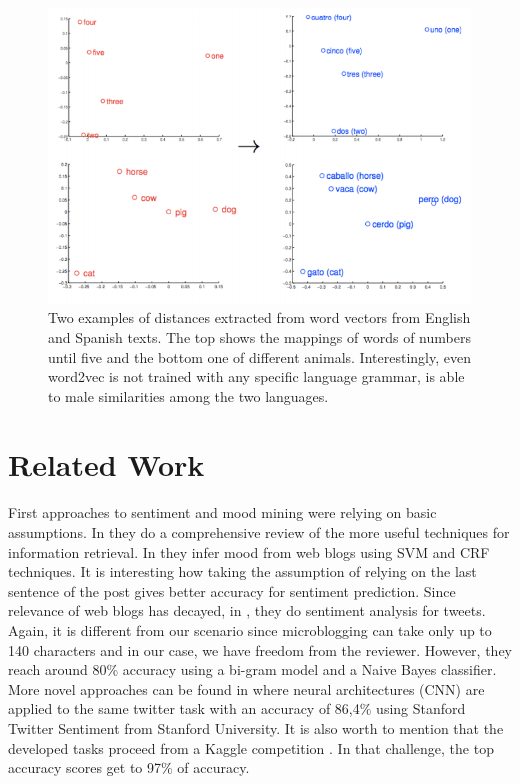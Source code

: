\documentclass[conference]{IEEEtran}
\theoremstyle{plain}
\theoremstyle{definition}
\theoremstyle{remark}
\begin{document}
\begin{figure}[htb]
	\centering
	\includegraphics[width=.75\linewidth]{word2vec_translation.png}
	\caption[bla.]{Two examples of distances extracted from word vectors from English and Spanish texts. The top shows the mappings of words of numbers until five and the bottom one of different animals. Interestingly, even word2vec is not trained with any specific language grammar, is able to male similarities among the two languages.}
	\label{fig:lap}
\end{figure}



\section{Related Work}
\label{sec:basics}
First approaches to sentiment and mood mining were relying on basic assumptions. In \cite{Pang} they do a comprehensive review of the more useful techniques for information retrieval.  In \cite{Yang} they infer mood from web blogs using SVM and CRF techniques. It is interesting how taking the assumption of relying on the last sentence of the post gives better accuracy for sentiment prediction. Since relevance of web blogs has decayed, in \cite{Pak}, they do sentiment analysis for tweets. Again, it is different from our scenario since microblogging can take only up to 140 characters and in our case, we have freedom from the reviewer. However, they reach around 80$\%$ accuracy using a bi-gram model and a Naive Bayes classifier. More novel approaches can be found in \cite{Noguishe} where neural architectures (CNN) are applied to the same twitter task with an accuracy of 86,4$\%$ using Stanford Twitter Sentiment from Stanford University. It is also worth to mention that the developed tasks proceed from a Kaggle competition \cite{Kaggle}. In that challenge, the top accuracy scores get to 97$\%$ of accuracy. 
\end{document}
